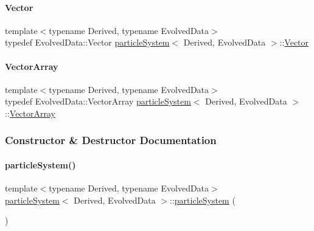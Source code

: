 \mbox{\label{classparticle_system_ab7ee6005b0bed27658db2fa983def5ec}} 
\paragraph{\texorpdfstring{Vector}{Vector}}
{\footnotesize\ttfamily template$<$typename Derived, typename Evolved\+Data$>$ \\
typedef Evolved\+Data\+::\+Vector \mbox{\hyperlink{classparticle_system}{particle\+System}}$<$ Derived, Evolved\+Data $>$\+::\mbox{\hyperlink{classparticle_system_ab7ee6005b0bed27658db2fa983def5ec}{Vector}}}

\mbox{\label{classparticle_system_a6f66ed187a286c0d42ab2f83b8b6193b}} 
\paragraph{\texorpdfstring{Vector\+Array}{VectorArray}}
{\footnotesize\ttfamily template$<$typename Derived, typename Evolved\+Data$>$ \\
typedef Evolved\+Data\+::\+Vector\+Array \mbox{\hyperlink{classparticle_system}{particle\+System}}$<$ Derived, Evolved\+Data $>$\+::\mbox{\hyperlink{classparticle_system_a6f66ed187a286c0d42ab2f83b8b6193b}{Vector\+Array}}}



\subsubsection{Constructor \& Destructor Documentation}
\mbox{\label{classparticle_system_a6fcdf55bb3999bde562ef2ba22693c6d}} 
\paragraph{\texorpdfstring{particle\+System()}{particleSystem()}}
{\footnotesize\ttfamily template$<$typename Derived, typename Evolved\+Data$>$ \\
\mbox{\hyperlink{classparticle_system}{particle\+System}}$<$ Derived, Evolved\+Data $>$\+::\mbox{\hyperlink{classparticle_system}{particle\+System}} (\begin{DoxyParamCaption}{ }\end{DoxyParamCaption})\hspace{0.3cm}{\ttfamily [inline]}}



